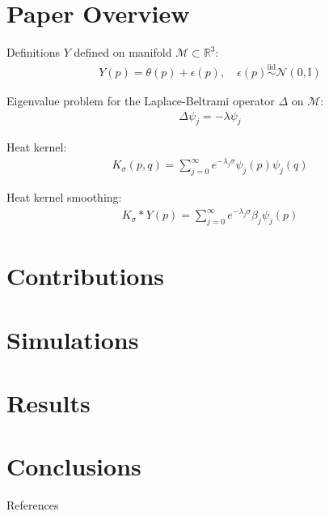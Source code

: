 \documentclass[8pt]{beamer}
\begin{document}
\section{Paper Overview}
\begin{frame}{Definitions}
$Y$ defined on manifold $\mathcal{M} \subset \mathbb{R}^3$:
\begin{align}
    Y(p) = \theta(p) + \epsilon(p), \quad \epsilon(p) \overset{\text{iid}}{\sim} \mathcal{N}(0, \mathbb{I})
\end{align}

Eigenvalue problem for the Laplace-Beltrami operator $\Delta$ on $\mathcal{M}$:
\begin{align}
    \Delta \psi_j = -\lambda \psi_j
\end{align}

Heat kernel:
\begin{align}
    K_{\sigma}(p, q) = \sum_{j=0}^\infty e^{-\lambda_j\sigma} \psi_j(p) \psi_j(q)
\end{align}

Heat kernel smoothing:
\begin{align}
    K_{\sigma}  \ast Y(p) = \sum_{j=0}^\infty e^{-\lambda_j \sigma} \beta_j \psi_j(p)
\end{align}

\end{frame}

\section{Contributions}

\section{Simulations}

\section{Results}

\section{Conclusions}

\begin{frame}{References}
    \small
    
\end{frame}
\end{document}
